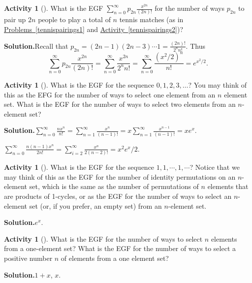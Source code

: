 \documentclass[10pt,]{book}
\theoremstyle{plain}
\theoremstyle{definition}
\newtheorem{activity}[project]{Activity}
\numberwithin{equation}{chapter}
\begin{document}
\begin{activity}[]\label{exponentialtennisparings}
What is the EGF \(\sum_{n=0}^\infty
p_{2n}\frac{x^{2n}}{(2n)!}\) for the number of ways \(p_{2n}\) to pair up \(2n\) people to play a total of \(n\) tennis matches (as in \hyperref[tennispairings1]{Problems~\ref{tennispairings1}} and \hyperref[tennispairings2]{Activity~\ref{tennispairings2}})?%
\par\medskip\noindent%
\textbf{Solution.}\quad Recall that \(p_{2n} = (2n-1)(2n-3)\cdots 1= \frac{(2n)!}{2^n
n!}\). Thus%
\begin{equation*}
\sum_{n=0}^\infty
p_{2n}\frac{x^{2n}}{(2n)!}= \sum_{n=0}^\infty \frac{x^{2n}}{2^n n!} =
\sum_{n=0}^\infty \frac{({x^2/2})^n}{n!} = e^{x^2/2} .
\end{equation*}
%
\end{activity}
\begin{activity}[]\label{activity-343}
What is the EGF for the sequence \(0,1,2,3,\ldots\)? You may think of this as the EFG for the number of ways to select one element from an \(n\) element set. What is the EGF for the number of ways to select two elements from an \(n\)-element set?%
\par\medskip\noindent%
\textbf{Solution.}\quad \(\sum_{n=0}^\infty\frac{nx^n}{n!}=\sum_{n=1}^\infty\frac{x^n}{(n-1)!}=x\sum_{n=1}^\infty\frac{x^{n-1}}{(n-1)!}=xe^x\).%
\par
\(\sum_{n=0}^\infty\frac{n(n-1)x^n}{2 n!}=\sum_{i=2}^\infty \frac{x^n}{2(n-2)!}=x^2e^x/2\).%
\end{activity}
\begin{activity}[]\label{allonessequence}
What is the EGF for the sequence \(1,1,\cdots,1,\cdots\)? Notice that we may think of this as the EGF for the number of identity permutations on an \(n\)-element set, which is the same as the number of permutations of \(n\) elements that are products of 1-cycles, or as the EGF for the number of ways to select an \(n\)-element set (or, if you prefer, an empty set) from an \(n\)-element set.%
\par\medskip\noindent%
\textbf{Solution.}\quad \(e^x\).%
\end{activity}
\begin{activity}[]\label{activity-345}
What is the EGF for the number of ways to select \(n\) elements from a one-element set? What is the EGF for the number of ways to select a positive number \(n\) of elements from a one element set?%
\par\medskip\noindent%
\textbf{Solution.}\quad \(1+x\), \(x\).%
\end{activity}
\end{document}
